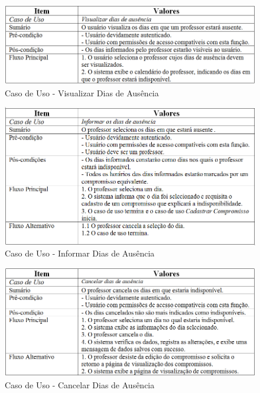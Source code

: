 \documentclass{abnt}
\begin{document}
\begin{figure}[h]
			\begin{center}
				 \includegraphics[width=450px]{VisualizarDiasAusencia}
				 \caption{Caso de Uso - Visualizar Dias de Ausência}
			\end{center}
		\end{figure}
\begin{figure}[h]
			\begin{center}
				 \includegraphics[width=450px]{InformarDiasAusencia}
				 \caption{Caso de Uso - Informar Dias de Ausência}
			\end{center}
		\end{figure}
\begin{figure}[h]
			\begin{center}
				 \includegraphics[width=450px]{CancelarDiasAusencia}
				 \caption{Caso de Uso - Cancelar Dias de Ausência}
			\end{center}
		\end{figure}
		\FloatBarrier
\end{document}
